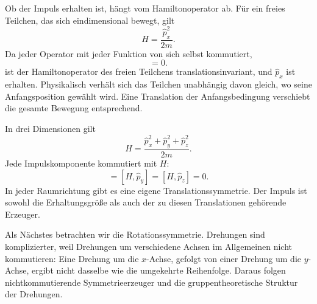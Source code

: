 Ob der Impuls erhalten ist, hängt vom Hamiltonoperator ab. Für ein freies Teilchen, das sich eindimensional bewegt, gilt
\begin{equation}
H=\frac{\hat p_x^2}{2m}.
\end{equation}
Da jeder Operator mit jeder Funktion von sich selbst kommutiert,
\begin{equation}
[H,\hat p_x]=0.
\end{equation}
ist der Hamiltonoperator des freien Teilchens translationsinvariant, und \(\hat p_x\) ist erhalten. Physikalisch verhält sich das Teilchen unabhängig davon gleich, wo seine Anfangsposition gewählt wird. Eine Translation der Anfangsbedingung verschiebt die gesamte Bewegung entsprechend.

In drei Dimensionen gilt
\begin{equation}
H
=
\frac{\hat p_x^2+\hat p_y^2+\hat p_z^2}{2m}.
\end{equation}
Jede Impulskomponente kommutiert mit \(H\):
\begin{equation}
[H,\hat p_x]=[H,\hat p_y]=[H,\hat p_z]=0.
\end{equation}
In jeder Raumrichtung gibt es eine eigene Translationssymmetrie. Der Impuls ist sowohl die Erhaltungsgröße als auch der zu diesen Translationen gehörende Erzeuger.

Als Nächstes betrachten wir die Rotationssymmetrie. Drehungen sind komplizierter, weil Drehungen um verschiedene Achsen im Allgemeinen nicht kommutieren: Eine Drehung um die \(x\)-Achse, gefolgt von einer Drehung um die \(y\)-Achse, ergibt nicht dasselbe wie die umgekehrte Reihenfolge. Daraus folgen nichtkommutierende Symmetrieerzeuger und die gruppentheoretische Struktur der Drehungen.

